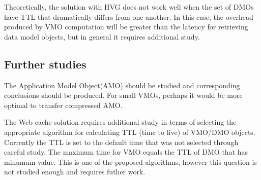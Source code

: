 Theoretically, the solution with HVG does not work well when the set of DMOs have TTL that dramatically differs from one another. In this case, the overhead produced by VMO computation will be greater than the latency for retrieving data model objects, but in general it requires additional study. 

\subsection{Further studies}

The Application Model Object(AMO) should be studied and corresponding conclusions should be produced. For small VMOs, perhaps it would be more optimal to transfer compressed AMO.

The Web cache solution requires additional study in terms of selecting the appropriate algorithm for calculating TTL (time to live) of VMO/DMO objects. Currently the TTL is set to the default time that was not selected through careful study. The maximum time for VMO equals the TTL of DMO that has minumum value. This is one of the proposed algorithms, however this question is not studied enough and requires futher work.

\newpage
